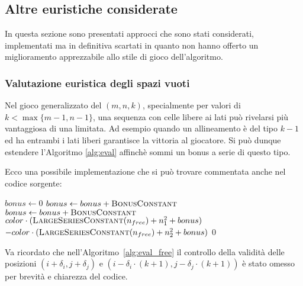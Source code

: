 \documentclass{article}
\begin{document}
\subsection{Altre euristiche considerate}

In questa sezione sono presentati approcci che sono stati considerati,
implementati ma in definitiva scartati in quanto non hanno offerto un
miglioramento apprezzabile allo stile di gioco dell'algoritmo.

\subsubsection{Valutazione euristica degli spazi vuoti}

Nel gioco generalizzato del $(m, n, k)$, specialmente per valori di $k < \max\{m-1,n-1\}$,
una sequenza con celle libere ai lati pu\`o rivelarsi pi\`u vantaggiosa di una
limitata. Ad esempio quando un allineamento \`e del tipo $k-1$ ed ha entrambi i lati liberi
garantisce la vittoria al giocatore. Si pu\`o dunque estendere l'Algoritmo
\vref{alg:eval} affinch\`e sommi un bonus a serie di questo tipo.

Ecco una possibile implementazione che si pu\`o trovare
commentata anche nel codice sorgente:

\begin{algorithm}[H]
  \caption{Valutazione delle serie favorendo spazi liberi adiacenti}
  \label{alg:eval_free}
  \begin{algorithmic}[0]
    \State {}
    \State $bonus \gets 0$
      \State $bonus \gets bonus + \textsc{BonusConstant}$
    \EndIf
      \State $bonus \gets bonus + \textsc{BonusConstant}$
    \EndIf
    \Statex
      \State \Return $color \cdot (\Call{LargeSeriesConstant}{n_{free}} + n_1^2 + bonus)$
    \State \Return $-color \cdot (\Call{LargeSeriesConstant}{n_{free}} + n_2^2 + bonus)$
    \Else
      \State \Return $0$
    \EndIf
    \EndProcedure
  \end{algorithmic}
\end{algorithm}

Va ricordato che nell'Algoritmo~\ref{alg:eval_free} il controllo della validit\`a delle
posizioni $(i + \delta_i, j + \delta_j)$ e $(i - \delta_i \cdot (k+1), j - \delta_j \cdot (k+1))$
\`e stato omesso per brevit\`a e chiarezza del codice.
\end{document}
